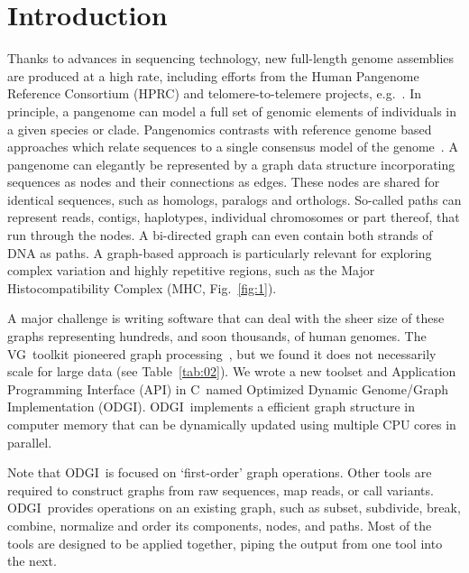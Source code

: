\documentclass{bioinfo}
\newcommand{\odgi}{ODGI}
\newcommand{\vg}{VG}
\newcommand{\Rplus}{\protect\hspace{-.1em}\protect\raisebox{.35ex}{\smaller{\smaller\textbf{+}}}}
\newcommand{\Cpp}{\mbox{C\Rplus\Rplus}\xspace}
\begin{document}
    \section{Introduction}

    Thanks to advances in sequencing technology, new full-length
    genome assemblies are produced at a high rate, including efforts
    from the Human Pangenome Reference Consortium (HPRC) and
    telomere-to-telemere projects, e.g.~\citep{Miga:2020}. In
    principle, a pangenome can model a full set of genomic elements of
    individuals in a given species or clade. Pangenomics contrasts
    with reference genome based approaches which relate sequences to a
    single consensus model of the genome~\citep{Eizenga:2020}. A
    pangenome can elegantly be represented by a graph data structure
    incorporating sequences as nodes and their connections as
    edges. These nodes are shared for identical sequences, such as
    homologs, paralogs and orthologs. So-called paths can represent
    reads, contigs, haplotypes, individual chromosomes or part
    thereof, that run through the nodes. A bi-directed graph can even
    contain both strands of DNA as paths. A graph-based approach is
    particularly relevant for exploring complex variation and highly
    repetitive regions, such as the Major Histocompatibility Complex
    (MHC, Fig.~\ref{fig:1}).

    A major challenge is writing software that can deal with the sheer
    size of these graphs representing hundreds, and soon thousands, of
    human genomes. The \vg\ toolkit pioneered graph
    processing~\citep{vgtools,Eizenga:2020b}, but we found it does not
    necessarily scale for large data (see Table~\ref{tab:02}). We
    wrote a new toolset and Application Programming Interface (API) in
    \Cpp\ named Optimized Dynamic Genome/Graph Implementation (ODGI).
    \odgi\ implements a efficient graph structure in computer memory
    that can be dynamically updated using multiple CPU cores in
    parallel.

    Note that \odgi\ is focused on `first-order' graph
    operations. Other tools are required to construct graphs from raw
    sequences, map reads, or call variants. \odgi\ provides
    operations on an existing graph, such as subset, subdivide, break,
    combine, normalize and order its components, nodes, and
    paths. Most of the tools are designed to be applied together,
    piping the output from one tool into the next.


    
\end{document}
